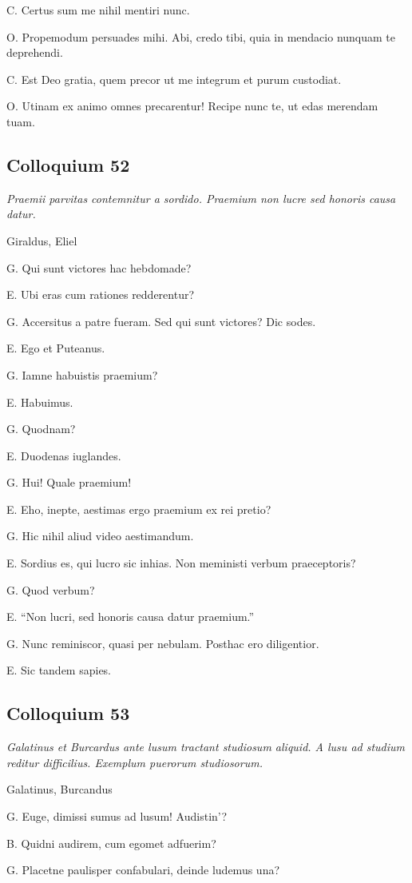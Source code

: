 \documentclass{article}
\begin{document}
C. Certus sum me nihil mentiri nunc.

O. Propemodum persuades mihi. Abi, credo tibi, quia in mendacio nunquam te deprehendi.

C. Est Deo gratia, quem precor ut me integrum et purum custodiat.

O. Utinam ex animo omnes precarentur! Recipe nunc te, ut edas merendam tuam.

\subsection{Colloquium 52}
\emph{Praemii parvitas contemnitur a sordido. Praemium non lucre sed honoris causa datur.}

Giraldus, Eliel

G. Qui sunt victores hac hebdomade?

E. Ubi eras cum rationes redderentur?

G. Accersitus a patre fueram. Sed qui sunt victores? Dic sodes.

E. Ego et Puteanus.

G. Iamne habuistis praemium?

E. Habuimus.

G. Quodnam?

E. Duodenas iuglandes.

G. Hui! Quale praemium!

E. Eho, inepte, aestimas ergo praemium ex rei pretio?

G. Hic nihil aliud video aestimandum.

E. Sordius es, qui lucro sic inhias. Non meministi verbum praeceptoris?

G. Quod verbum?

E. ``Non lucri, sed honoris causa datur praemium.''

G. Nunc reminiscor, quasi per nebulam. Posthac ero diligentior.

E. Sic tandem sapies.
\subsection{Colloquium 53}
\emph{Galatinus et Burcardus ante lusum tractant studiosum aliquid. A lusu ad studium reditur difficilius. Exemplum puerorum studiosorum.}

Galatinus, Burcandus

G. Euge, dimissi sumus ad lusum! Audistin'?

B. Quidni audirem, cum egomet adfuerim?

G. Placetne paulisper confabulari, deinde ludemus una?
\end{document}
